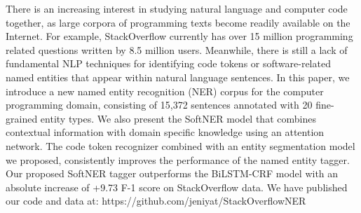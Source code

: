 There is an increasing interest in studying natural language and computer code together, as large corpora of programming texts become readily available on the Internet. For example, StackOverflow currently has over 15 million programming related questions written by 8.5 million users. Meanwhile, there is still a lack of fundamental NLP techniques for identifying code tokens or software-related named entities that appear within natural language sentences. In this paper, we introduce a new named entity recognition (NER) corpus for the computer programming domain, consisting of 15,372 sentences annotated with 20 fine-grained entity types. We also present the SoftNER model that combines contextual information with domain specific knowledge using an attention network. The code token recognizer combined with an entity segmentation model we proposed, consistently improves the performance of the named entity tagger. Our proposed SoftNER tagger outperforms the BiLSTM-CRF model with an absolute increase of +9.73 F-1 score on StackOverflow data. We have published our code and data at: https://github.com/jeniyat/StackOverflowNER
